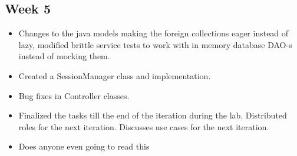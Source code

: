 \documentclass[12pt]{article}
\begin{document}
\subsection*{Week 5}

\begin{itemize}
\item Changes to the java models making the foreign collections eager instead of lazy, modified brittle service tests to work with in memory database DAO-s instead of mocking them. 

\item Created a SessionManager class and implementation. 

\item Bug fixes in Controller classes. 

\item Finalized the tasks till the end of the iteration during the lab. Distributed roles for the next iteration. Discusses use cases for the next iteration.

\item Does anyone even going to read this

\end{itemize}
\end{document}

